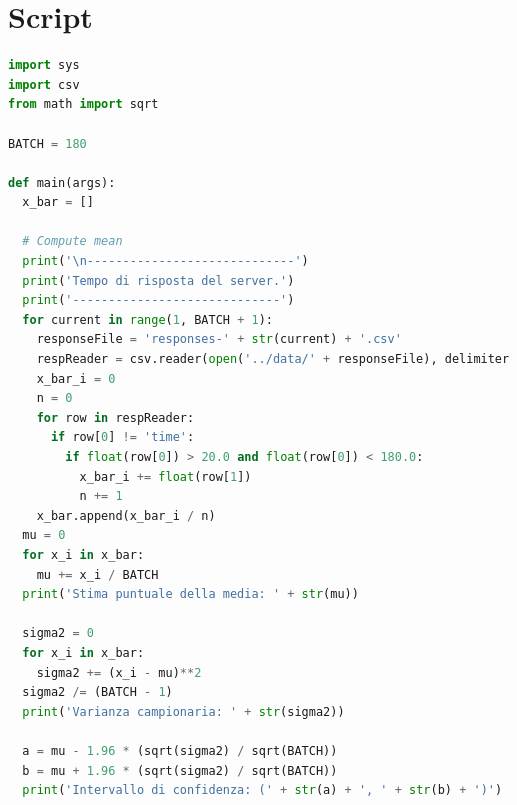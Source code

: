 \documentclass[a4paper, 11pt, oneside]{book}
\theoremstyle{definition}
\theoremstyle{remark}
\begin{document}
\appendix
\chapter{Script}\label{script}
\begin{lstlisting}[language = Python,
                   title = {Calcolo di media, varianza e intervalli di
confidenza.}
                  ]
import sys
import csv
from math import sqrt

BATCH = 180

def main(args):
  x_bar = []

  # Compute mean
  print('\n-----------------------------')
  print('Tempo di risposta del server.')
  print('-----------------------------')
  for current in range(1, BATCH + 1):
    responseFile = 'responses-' + str(current) + '.csv'
    respReader = csv.reader(open('../data/' + responseFile), delimiter = ',')
    x_bar_i = 0
    n = 0
    for row in respReader:
      if row[0] != 'time':
        if float(row[0]) > 20.0 and float(row[0]) < 180.0:
          x_bar_i += float(row[1])
          n += 1
    x_bar.append(x_bar_i / n)
  mu = 0
  for x_i in x_bar:
    mu += x_i / BATCH
  print('Stima puntuale della media: ' + str(mu))

  sigma2 = 0
  for x_i in x_bar:
    sigma2 += (x_i - mu)**2
  sigma2 /= (BATCH - 1)
  print('Varianza campionaria: ' + str(sigma2))

  a = mu - 1.96 * (sqrt(sigma2) / sqrt(BATCH))
  b = mu + 1.96 * (sqrt(sigma2) / sqrt(BATCH))
  print('Intervallo di confidenza: (' + str(a) + ', ' + str(b) + ')')
\end{lstlisting}



\end{document}
